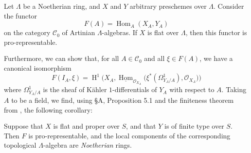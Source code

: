 \begin{proposition}\label{fga3.ii-c.2-proposition-2.1}
    Let $\Lambda$ be a Noetherian ring, and $X$ and $Y$ arbitrary preschemes over $\Lambda$.
    Consider the functor
    \[
        F(A)
        = \operatorname{Hom}_A(X_A,Y_A)
    \]
    on the category $\mathcal{C}_0$ of Artinian $\Lambda$-algebras.
    If $X$ is flat over $\Lambda$, then this functor is pro-representable.
\end{proposition}


Furthermore, we can show that, for all $A\in\mathcal{C}_0$ and all $\xi\in F(A)$, we have a canonical isomorphism
\[
    F(I_A,\xi)
    = \operatorname{H}^1\Big(X_A,\underline{\operatorname{Hom}}_{\mathcal{O}_{X_A}}\big(\xi^*(\Omega_{Y_A/A}^1),\mathcal{O}_{X_A}\big)\Big)
\]
where $\Omega_{Y_A/A}^1$ is the sheaf of Kähler $1$-differentials of $Y_A$ with respect to $A$.
Taking $A$ to be a field, we find, using §A, Proposition 5.1  and the finiteness theorem from , the following corollary:


\begin{proposition}\label{fga3.ii-c.2-proposition-2.1-corollary}
    Suppose that $X$ is flat and proper over $S$, and that $Y$ is of finite type over $S$.
    Then $F$ is pro-representable, and the local components of the corresponding topological $\Lambda$-algebra are \emph{Noetherian} rings.
\end{proposition}

